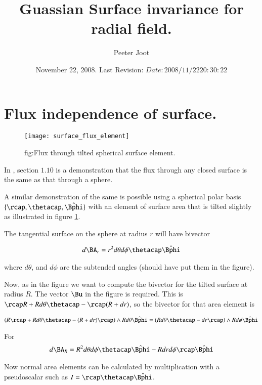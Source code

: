 \documentclass{article}
\title{ Guassian Surface invariance for radial field. }
\author{Peeter Joot}
\date{ November 22, 2008.  Last Revision: $Date: 2008/11/22 20:30:22 $ }
\newcommand{\phicap}[0]{\hat{\Bphi}}
\begin{document}
\maketitle{}
\section{ Flux independence of surface. }

\begin{figure}[htp]
\centering
\texttt{[image: surface\_flux\_element]}
\caption{fig:Flux through tilted spherical surface element.}
\label{fig:surface_flux_element}
\end{figure}

In \cite{purcell1963eam}, section $1.10$ is a demonstration that the flux
through any closed surface is the same as that through a sphere.

A similar demonstration of the same is possible using a spherical polar basis
$\{\rcap, \thetacap, \phicap\}$ with an element of surface area that is
tilted slightly as illustrated in figure \ref{fig:surface_flux_element}.

The tangential surface on the sphere at radius $r$ will have bivector

\begin{align}
d\BA_r = r^2 d\theta d\phi \thetacap\phicap
\end{align}

where $d\theta$, and $d\phi$ are the subtended angles (should have put them in the figure).

Now, as in the figure we want to compute the bivector for the tilted surface at radius $R$.  The vector $\Bu$ in the figure is required.
This is $\rcap R + R d\theta \thetacap - \rcap(R + dr)$, so the bivector for that area element is

\begin{align*}
\left(R \rcap + R d\theta \thetacap - (R + dr) \rcap \right) \wedge {R d\theta \phicap} 
&= \left(R d\theta \thetacap - dr \rcap \right) \wedge {R d\phi \phicap} \\
\end{align*}

For
\begin{align}
d\BA_R = R^2 d\theta d\phi \thetacap \phicap - R dr d\phi \rcap \phicap
\end{align}

Now normal area elements can be calculated by multiplication with a  pseudoscalar such as $I = \rcap \thetacap \phicap$.
\end{document}

